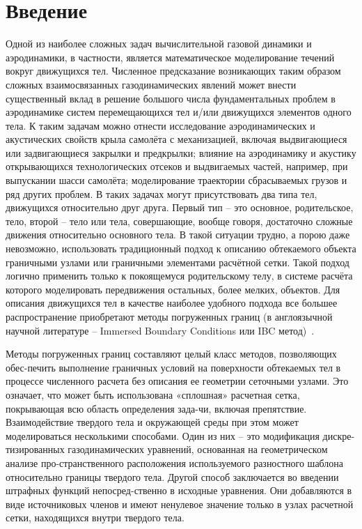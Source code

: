 \chapter*{Введение}                         %
	Одной из наиболее сложных задач вычислительной газовой динамики и аэродинамики, в частности, является математическое моделирование течений вокруг движущихся тел. Численное предсказание возникающих таким образом сложных взаимосвязанных газодинамических явлений может внести существенный вклад в решение большого числа фундаментальных проблем в аэродинамике систем перемещающихся тел и/или движущихся элементов одного тела. К таким задачам можно отнести исследование аэродинамических и акустических свойств крыла самолёта с механизацией, включая выдвигающиеся или задвигающиеся закрылки и предкрылки; влияние на аэродинамику и акустику открывающихся технологических отсеков и выдвигаемых частей, например, при выпускании шасси самолёта; моделирование траектории сбрасываемых грузов и ряд других проблем. В таких задачах могут присутствовать два типа тел, движущихся относительно друг друга. Первый тип – это основное, родительское, тело, второй – тело или тела, совершающие, вообще говоря, достаточно сложные движения относительно основного тела. В такой ситуации трудно, а порою даже невозможно, использовать традиционный подход к описанию обтекаемого объекта граничными узлами или граничными элементами расчётной сетки. Такой подход логично применить только к покоящемуся родительскому телу, в системе расчёта которого моделировать передвижения остальных, более мелких, объектов. Для описания движущихся тел в качестве наиболее удобного подхода все большее распространение приобретают методы погруженных границ (в англоязычной научной литературе – Immersed Boundary Conditions или IBC метод)~\cite{mittal2005immersed, boiron2009high, brown2014characteristic}.

	Методы погруженных границ составляют целый класс методов, позволяющих обес-печить выполнение граничных условий на поверхности обтекаемых тел в процессе численного расчета без описания ее геометрии сеточными узлами. Это означает, что может быть использована «сплошная» расчетная сетка, покрывающая всю область определения зада-чи, включая препятствие. Взаимодействие твердого тела и окружающей среды при этом может моделироваться несколькими способами. Один из них – это модификация дискре-тизированных газодинамических уравнений, основанная на геометрическом анализе про-странственного расположения используемого разностного шаблона относительно границы твердого тела. Другой способ заключается во введении штрафных функций непосред-ственно в исходные уравнения. Они добавляются в виде источниковых членов и имеют ненулевое значение только в узлах расчетной сетки, находящихся внутри твердого тела.

